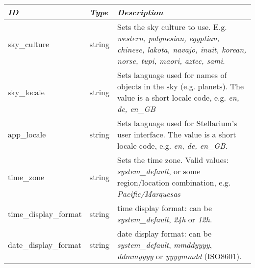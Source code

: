 \subsection{}\label{sec:config.ini:localization}

\begin{longtabu} to \textwidth {l|l|X}\toprule
\emph{ID}         & \emph{Type} & \emph{Description}\\\midrule
sky\_culture          & string & Sets the sky culture to use. E.g. \emph{western, polynesian, egyptian, chinese, 
                                 lakota, navajo, inuit, korean, norse, tupi, maori, aztec, sami}.\\\midrule
sky\_locale           & string & Sets language used for names of objects in the sky (e.g. planets). 
                                 The value is a short locale code, e.g. \emph{en, de, en\_GB}\\\midrule
app\_locale           & string & Sets language used for Stellarium's user interface. 
                                  The value is a short locale code, e.g. \emph{en, de, en\_GB}.\\\midrule
time\_zone            & string & Sets the time zone. Valid values: \emph{system\_default}, 
                                 or some region/location combination, e.g. \emph{Pacific/Marquesas}\\\midrule
time\_display\_format & string & time display format: can be \emph{system\_default}, \emph{24h} or \emph{12h}.\\\midrule
date\_display\_format & string & date display format: can be \emph{system\_default}, \emph{mmddyyyy}, \emph{ddmmyyyy} or \emph{yyyymmdd} (ISO8601).\\\bottomrule
\end{longtabu}

\subsection{}\label{sec:config.ini:main}

